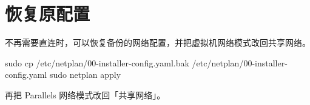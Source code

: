 \chapter{恢复原配置}
\label{app:restore}
不再需要直连时，可以恢复备份的网络配置，并把虚拟机网络模式改回共享网络。

\begin{command}
sudo cp /etc/netplan/00-installer-config.yaml.bak /etc/netplan/00-installer-config.yaml
sudo netplan apply
\end{command}

再把 Parallels 网络模式改回「共享网络」。
